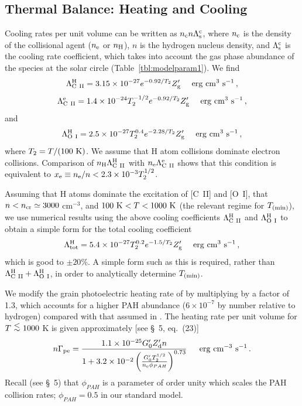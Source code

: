 \documentclass[12pt,preprint,flushrt]{aastex}
\newcommand{\beq}{\begin{equation}}
\newcommand{\eeq}{\end{equation}}
\newcommand{\al}{\mbox{ \raisebox{-.4ex}{$\stackrel{\textstyle <}{\sim}$} }}
\newcommand{\tmin}{T_{\rm (min)}}
\newcommand{\gs}{G_{0}^\prime}
\newcommand{\zd}{Z_{\rm d}^\prime}
\newcommand{\zg}{Z_{\rm g}^\prime}
\begin{document}
\subsection{Thermal Balance: Heating and Cooling}

Cooling rates per unit volume can be written as
$n_{\rm c} n \Lambda_{\rm s}^{\rm c}$, where $n_{\rm c}$
is the density of the collisional agent ($n_{\rm e}$ or $n_{\rm H}$),
$n$ is the hydrogen nucleus density, and $\Lambda_{\rm s}^{\rm c}$
is the cooling rate
coefficient, which takes into account the gas phase abundance of the
species at the solar circle (Table~\ref{tbl:modelparam1}). We find
\beq
\Lambda_{\rm C~II}^{\rm H} = 3.15\times 10^{-27}e^{-0.92/T_2}\zg
                        \,\,\,\,\,\,\,\, {\rm erg\,\, cm^{3}\,\, s^{-1}}\, ,
\eeq
\beq
\Lambda_{\rm C~II}^{\rm e} = 1.4\times 10^{-24}T_2^{-1/2}
                                      e^{-0.92/T_2}\zg
                        \,\,\,\,\,\,\,\, {\rm erg\,\, cm^{3}\,\, s^{-1}}\, ,
\eeq
and
\beq
\Lambda_{\rm O~I}^{\rm H} = 2.5\times 10^{-27}T_2^{0.4}
                                      e^{-2.28/T_2}\zg
                           \,\,\,\,\,\,\,\, {\rm erg\,\, cm^{3}\,\, s^{-1}}\, ,
\eeq
where $T_2 =T/(100\,\, {\rm K})$. We assume that H atom collisions
dominate electron collisions. Comparison of
$n_{\rm H}\Lambda_{\rm C~II}^{\rm H}$
with $n_{\rm e}\Lambda_{\rm C~II}^{\rm e}$ shows that this condition is
equivalent to $x_{\rm e}\equiv n_{\rm e}/n < 2.3\times 10^{-3}T_2^{1/2}$.

Assuming that H atoms dominate the excitation of [C~II] and [O~I],
that $n < n_{\rm cr} \simeq 3000$ cm$^{-3}$, and
$100\,\,{\rm K} < T < 1000\,\, {\rm K}$
(the relevant regime for $\tmin$), we use numerical
results using the above cooling coefficients  $\Lambda_{\rm C~II}^{\rm H}$
and  $\Lambda_{\rm O~I}^{\rm H}$ to obtain a simple form for
the total cooling coefficient
\beq
\Lambda_{\rm tot}^{\rm H} = 5.4\times 10^{-27}T_2^{0.2}
                                      e^{-1.5/T_2}\zg
                       \,\,\,\,\,\,\,\, {\rm erg\,\, cm^{3}\,\, s^{-1}}\, ,
\label{eq:cool}
\eeq
which is good to $\pm 20$\%. 
A simple form such as this is required,
rather than $\Lambda_{\rm C~II}^{\rm H} + \Lambda_{\rm O~I}^{\rm H}$,
in order to analytically determine $\tmin$.

We modify the grain photoelectric heating rate of \cite{bak94} by
multiplying by a factor of 1.3, which accounts for a higher PAH
abundance ($6\times 10^{-7}$ by number relative to hydrogen) compared
with that assumed in \cite{bak94}.
The heating rate per unit volume for $T \al 1000$ K
is given approximately [see \S~5, eq.\ (23)]
\beq
n\Gamma_{\rm pe} = \frac{1.1\times 10^{-25} \gs \zd n}
{1 + 3.2\times 10^{-2}\left(\frac{\gs T_2^{1/2}}{n_{\rm e}\phi _{PAH}}\right)^{0.73}}
\,\,\,\,\,\,\,\,\, {\rm erg\,\,cm^{-3}\,\, s^{-1}}\, .
\label{eq:gphe}
\eeq
Recall (see \S\ 5) that $\phi _{PAH}$ is a  parameter of order unity which scales the
PAH collision rates; $\phi _{PAH} = 0.5$ in our standard model.
\end{document}
